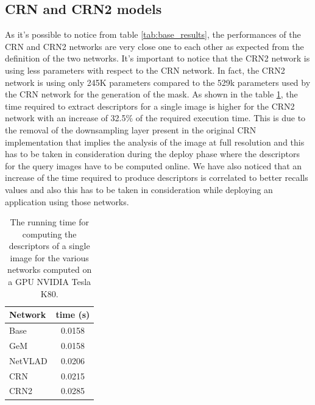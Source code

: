 \documentclass[10pt,twocolumn,letterpaper]{article}
\begin{document}
\subsection{CRN and CRN2 models}
As it's possible to notice from table \ref{tab:base_results}, the performances of the CRN and CRN2 networks are very close one to each other as expected
from the definition of the two networks. It's important to notice that the CRN2 network is using less parameters with respect to the CRN network. In fact,
the CRN2 network is using only 245K parameters compared to the 529k parameters used by the CRN network for the generation of the mask.
As shown in the table \ref{tab:time}, the time required to extract descriptors for a single image is higher for the CRN2 network with an increase of 32.5\% 
of the required execution time. This is due to the removal of the downsampling layer present in the original CRN implementation that implies the analysis of the image 
at full resolution and this 
has to be taken in consideration during the deploy phase where the descriptors for the query images have to be computed online. We have also noticed that an increase
of the time required to produce descriptors is correlated to better recalls values and also this has to be taken in consideration while deploying an 
application using those networks.

\begin{table}
   \centering
   \begin{tabular}{|l|c|}
      \hline
      Network     &  time (s)\\\hline
      Base        &  0.0158\\
      GeM         &  0.0158\\
      NetVLAD     &  0.0206\\
      CRN         &  0.0215\\
      CRN2        &  0.0285\\\hline
   \end{tabular}
   \caption{The running time for computing the descriptors of a single image for the various networks computed on a GPU NVIDIA Tesla K80.}
   \label{tab:time}
\end{table}

	
\end{document}
